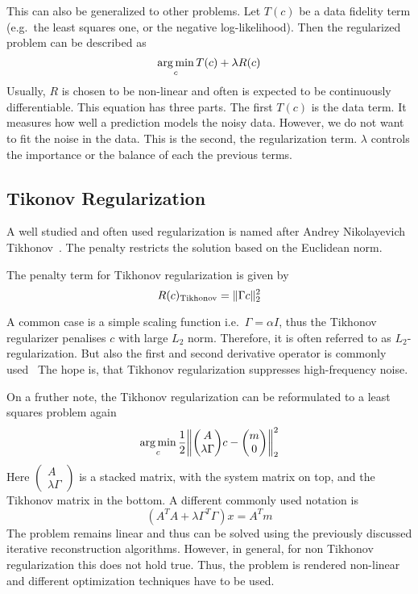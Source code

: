 This can also be generalized to other problems. Let \(T(c)\) be a data fidelity term (e.g.\
the least squares one, or the negative log-likelihood). Then the regularized problem can be
described as
\[ \operatorname*{arg\,min}_c T(c) + \lambda R(c) \]
Usually, \(R\) is chosen to be non-linear and often is expected to be continuously differentiable.
This equation has three parts. The first \(T(c)\) is the data term. It measures how well a
prediction models the noisy data. However, we do not want to fit the noise in the data. This is the
second, the regularization term. \(\lambda\) controls the importance or the balance of each the
previous terms.

\subsection{Tikonov Regularization}\label{subsec:tikhonov_regularization}

A well studied and often used regularization is named after Andrey Nikolayevich
Tikhonov~\cite{tihonov_solution_1963}. The penalty restricts the solution based on the Euclidean
norm.

\begin{definition}\label{def:tikhonov_regularization}
	The penalty term for Tikhonov regularization is given by
	\[
		R(c)_{\text{Tikhonov}} = \lVert\Gamma c\rVert_2^2
	\]
\end{definition}
A common case is a simple scaling function i.e.\ \(\Gamma = \alpha I\), thus the Tikhonov
regularizer penalises \(c\) with large \(L_2\) norm. Therefore, it is often referred to as
\(L_2\)-regularization. But also the first and second derivative operator is commonly
used~\cite{golub_tikhonov_1999} The hope is, that Tikhonov regularization suppresses high-frequency
noise.

On a fruther note, the Tikhonov regularization can be reformulated to a least squares problem again
\[
	\argmin_c \frac{1}{2}
	\left\lVert
	\begin{pmatrix}
		A \\
		\lambda \Gamma
	\end{pmatrix}
	c -
	\begin{pmatrix}
		m \\
		0
	\end{pmatrix}
	\right\rVert_2^2
\]
Here \(\begin{pmatrix}
	A \\
	\lambda \Gamma
\end{pmatrix}\) is a stacked matrix, with the system matrix on top, and the Tikhonov matrix in the
bottom. A different commonly used notation is
\[
	(A^T A + \lambda \Gamma^T \Gamma)x = A^T m
\]
The problem remains linear and thus can be solved using the previously discussed iterative
reconstruction algorithms. However, in general, for non Tikhonov regularization this does not hold
true. Thus, the problem is rendered non-linear and different optimization techniques have to be
used.

